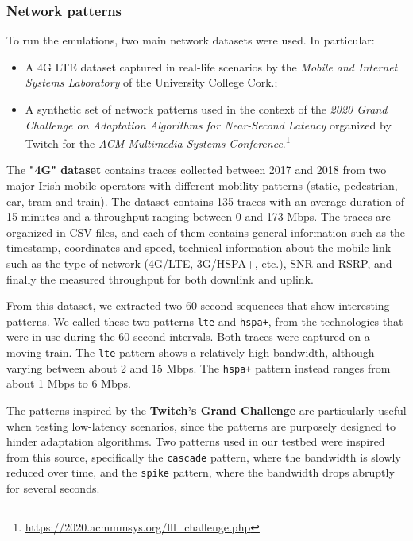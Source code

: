 \subsubsection{Network patterns}
\label{sec:eval/testbed/network/patterns}

To run the emulations, two main network datasets were used. In particular:

\begin{itemize}
    \item A 4G LTE dataset captured in real-life scenarios by the \textit{Mobile and Internet Systems Laboratory} of the University College Cork.\cite{dataset1};
    \item A synthetic set of network patterns used in the context of the \textit{2020 Grand Challenge on Adaptation Algorithms for Near-Second Latency} organized by Twitch for the \textit{ACM Multimedia Systems Conference}.\footnote{\url{https://2020.acmmmsys.org/lll_challenge.php}}
\end{itemize}

The \textbf{"4G" dataset} contains traces collected between 2017 and 2018 from two major Irish mobile operators with different mobility patterns (static, pedestrian, car, tram and train). The dataset contains 135 traces with an average duration of 15 minutes and a throughput ranging between 0 and 173 Mbps. The traces are organized in CSV files, and each of them contains general information such as the timestamp, coordinates and speed, technical information about the mobile link such as the type of network (4G/LTE, 3G/HSPA+, etc.), SNR and RSRP, and finally the measured throughput for both downlink and uplink.

From this dataset, we extracted two 60-second sequences that show interesting patterns. We called these two patterns \texttt{lte} and \texttt{hspa+}, from the technologies that were in use during the 60-second intervals. Both traces were captured on a moving train. The \texttt{lte} pattern shows a relatively high bandwidth, although varying between about 2 and 15 Mbps. The \texttt{hspa+} pattern instead ranges from about 1 Mbps to 6 Mbps.

The patterns inspired by the \textbf{Twitch's Grand Challenge} are particularly useful when testing low-latency scenarios, since the patterns are purposely designed to hinder adaptation algorithms. Two patterns used in our testbed were inspired from this source, specifically the \texttt{cascade} pattern, where the bandwidth is slowly reduced over time, and the \texttt{spike} pattern, where the bandwidth drops abruptly for several seconds.

